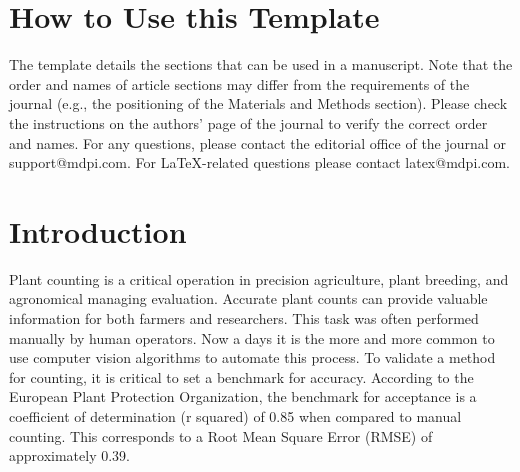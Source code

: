 \documentclass[journal,article,submit,pdftex,moreauthors]{Definitions/mdpi}
\begin{document}
\setcounter{section}{-1} %
\section{How to Use this Template}

The template details the sections that can be used in a manuscript. Note that the order and names of article sections may differ from the requirements of the journal (e.g., the positioning of the Materials and Methods section). Please check the instructions on the authors' page of the journal to verify the correct order and names. For any questions, please contact the editorial office of the journal or support@mdpi.com. For LaTeX-related questions please contact latex@mdpi.com.%


\section{Introduction}

Plant counting is a critical operation in precision agriculture, plant breeding, 
and agronomical managing evaluation. 
Accurate plant counts can provide valuable information for both farmers and researchers.
This task was often performed manually by human operators. 
Now a days it is the more and more common to use computer vision algorithms to 
automate this process.
To validate a method for counting, it is critical to set a benchmark for accuracy. 
According to the European Plant Protection Organization, the benchmark for acceptance is 
a coefficient of determination (r squared) of 0.85 when compared to manual counting. 
This corresponds to a Root Mean Square Error (RMSE) of approximately 0.39.
\end{document}
